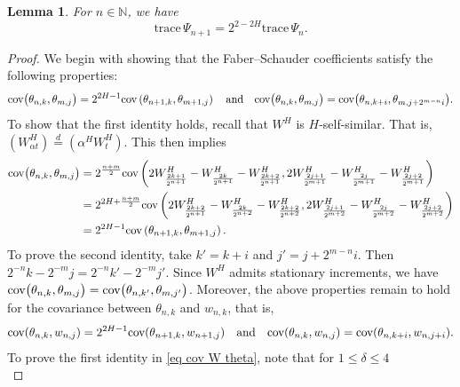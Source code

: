 \documentclass[12pt,reqno]{article}
\def\trace#1{\text{trace}\, #1}
\numberwithin{equation}{section}
\def\cov{\mbox{cov}}
\def\var{\mbox{var}}
\newtheorem{lemma}[theorem]{Lemma}
\theoremstyle{definition}
\def\cov{\hbox{\rm cov}}\def\var{\text{\rm Var}}
\newcommand{\bN}{\mathbb{N}}
\begin{document}
\begin{lemma}\label{lemma trace vartheta}
	For $n \in \bN$, we have 
	\begin{equation*}
		\trace{\Psi_{n+1}} = 2^{2-2H}\trace{\Psi_n}.
	\end{equation*}
\end{lemma}
\begin{proof}
	We begin with showing that the Faber--Schauder coefficients satisfy the following properties: 
	\begin{equation}\label{eq Faber WH}
		\cov\big(\theta_{n,k},\theta_{m,j}\big) = 2^{2H-1}\cov\left(\theta_{n+1,k},\theta_{m+1,j}\right) \quad  \text{and} \quad \cov\big(\theta_{n,k},\theta_{m,j}\big) = \cov\big(\theta_{n,k+i},\theta_{m,j+2^{m-n}i}\big).
	\end{equation}
	To show that the first identity holds, recall that $W^H$ is $H$-self-similar. That is, $(W^H_{\alpha t}) \overset{d}{=} (\alpha^HW^H_{t})$. This then implies
	\begin{equation*}
		\begin{split}
				\cov\big(\theta_{n,k},\theta_{m,j}\big) &= 2^{\frac{n+m}{2}}\cov\left(2W^H_{\frac{2k+1}{2^{n+1}}} - W^H_{\frac{2k}{2^{n+1}}}-W^H_{\frac{2k+2}{2^{n+1}}}, 2W^H_{\frac{2j+1}{2^{m+1}}} - W^H_{\frac{2j}{2^{m+1}}}-W^H_{\frac{2j+2}{2^{m+1}}}\right)\\&= 2^{2H+\frac{n+m}{2}}\cov\left(2W^H_{\frac{2k+2}{2^{n+1}}} - W^H_{\frac{2k}{2^{n+2}}}-W^H_{\frac{2k+2}{2^{n+2}}}, 2W^H_{\frac{2j+1}{2^{m+2}}} - W^H_{\frac{2j}{2^{m+2}}}-W^H_{\frac{2j+2}{2^{m+2}}}\right)\\&= 2^{2H-1}\cov\left(\theta_{n+1,k},\theta_{m+1,j}\right).
		\end{split}
	\end{equation*}
	To prove the second identity, take $k' = k + i$ and $j' = j + 2^{m-n}i$. Then $2^{-n}k - 2^{-m}j = 2^{-n}k' - 2^{-m}j'$. Since $W^H$ admits stationary increments, we have $\cov\big(\theta_{n,k},\theta_{m,j}\big) = \cov\big(\theta_{n,k'},\theta_{m,j'}\big)$. Moreover, the above properties remain to hold for the covariance  between $\theta_{n,k}$ and $w_{n,k}$, that is,
	\begin{equation}\label{eq cov W theta}
		\cov(\theta_{n,k}, w_{n,j}) = 2^{2H-1}\cov(\theta_{n+1,k}, w_{n+1,j}) \quad \text{and} \quad \cov(\theta_{n,k}, w_{n,j}) = \cov(\theta_{n,k+i}, w_{n,j+i}).
	\end{equation}
	To prove the first identity in \eqref{eq cov W theta}, note that for $1 \le \delta \le 4$
	\begin{equation*}

\end{equation*}
\end{proof}
\end{document}
